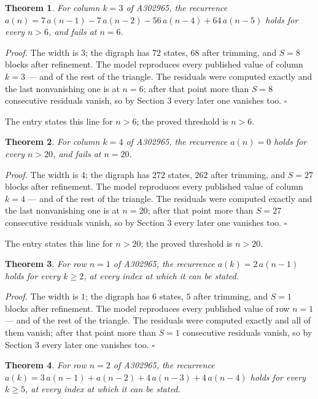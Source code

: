 \documentclass[11pt]{article}
\newtheorem{theorem}{Theorem}
\theoremstyle{definition}
\begin{document}
\begin{theorem} For column $k = 3$ of A302965, the recurrence $a(n) = 7\,a(n-1) - 7\,a(n-2) - 56\,a(n-4) + 64\,a(n-5)$ holds for every $n > 6$, and fails at $n = 6$.\end{theorem}

{\itshape Proof.} The width is $3$; the digraph has $72$ states, $68$ after trimming, and $S = 8$ blocks after refinement. The model reproduces every published value of column $k = 3$ --- and of the rest of the triangle. The residuals were computed exactly and the last nonvanishing one is at $n = 6$; after that point more than $S = 8$ consecutive residuals vanish, so by Section 3 every later one vanishes too. $\square$

The entry states this line for $n > 6$; the proved threshold is $n > 6$.

\begin{theorem} For column $k = 4$ of A302965, the recurrence $a(n) = 0$ holds for every $n > 20$, and fails at $n = 20$.\end{theorem}

{\itshape Proof.} The width is $4$; the digraph has $272$ states, $262$ after trimming, and $S = 27$ blocks after refinement. The model reproduces every published value of column $k = 4$ --- and of the rest of the triangle. The residuals were computed exactly and the last nonvanishing one is at $n = 20$; after that point more than $S = 27$ consecutive residuals vanish, so by Section 3 every later one vanishes too. $\square$

The entry states this line for $n > 20$; the proved threshold is $n > 20$.

\begin{theorem} For row $n = 1$ of A302965, the recurrence $a(k) = 2\,a(n-1)$ holds for every $k \ge 2$, at every index at which it can be stated.\end{theorem}

{\itshape Proof.} The width is $1$; the digraph has $6$ states, $5$ after trimming, and $S = 1$ blocks after refinement. The model reproduces every published value of row $n = 1$ --- and of the rest of the triangle. The residuals were computed exactly and all of them vanish; after that point more than $S = 1$ consecutive residuals vanish, so by Section 3 every later one vanishes too. $\square$

\begin{theorem} For row $n = 2$ of A302965, the recurrence $a(k) = 3\,a(n-1) + a(n-2) + 4\,a(n-3) + 4\,a(n-4)$ holds for every $k \ge 5$, at every index at which it can be stated.\end{theorem}
\end{document}
